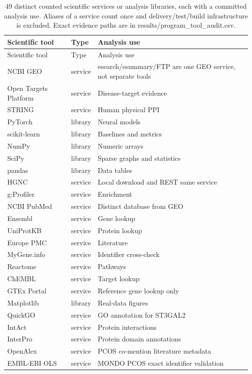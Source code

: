 \begin{longtable}{p{3.4cm}p{1.1cm}p{8.6cm}}
\caption{49 distinct counted scientific services or analysis libraries, each with a committed analysis use. Aliases of a service count once and delivery/test/build infrastructure is excluded. Exact evidence paths are in results/program\_tool\_audit.csv.}\\
\hline Scientific tool & Type & Analysis use\\\hline\endfirsthead
\hline Scientific tool & Type & Analysis use\\\hline\endhead
NCBI GEO & service & esearch/esummary/FTP are one GEO service, not separate tools\\
Open Targets Platform & service & Disease-target evidence\\
STRING & service & Human physical PPI\\
PyTorch & library & Neural models\\
scikit-learn & library & Baselines and metrics\\
NumPy & library & Numeric arrays\\
SciPy & library & Sparse graphs and statistics\\
pandas & library & Data tables\\
HGNC & service & Local download and REST same service\\
g:Profiler & service & Enrichment\\
NCBI PubMed & service & Distinct database from GEO\\
Ensembl & service & Gene lookup\\
UniProtKB & service & Protein lookup\\
Europe PMC & service & Literature\\
MyGene.info & service & Identifier cross-check\\
Reactome & service & Pathways\\
ChEMBL & service & Target lookup\\
GTEx Portal & service & Reference gene lookup only\\
Matplotlib & library & Real-data figures\\
QuickGO & service & GO annotation for ST3GAL2\\
IntAct & service & Protein interactions\\
InterPro & service & Protein domain annotations\\
OpenAlex & service & PCOS co-mention literature metadata\\
EMBL-EBI OLS & service & MONDO PCOS exact identifier validation\\

\end{longtable}
